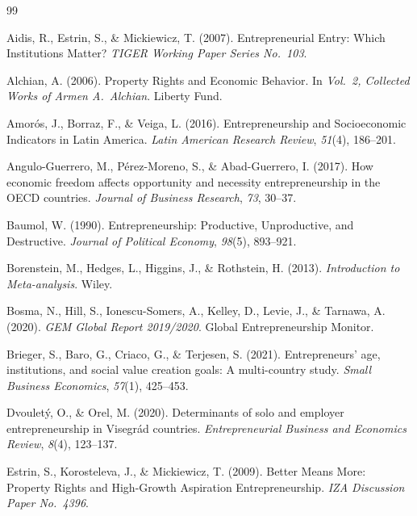 \documentclass[12pt]{article}
\begin{document}
\newpage
\begin{thebibliography}{99}

Aidis, R., Estrin, S., \& Mickiewicz, T. (2007). Entrepreneurial Entry: Which Institutions Matter? \textit{TIGER Working Paper Series No.~103}.

Alchian, A. (2006). Property Rights and Economic Behavior. In \textit{Vol.~2, Collected Works of Armen A.~Alchian}. Liberty Fund.

Amor{\'o}s, J., Borraz, F., \& Veiga, L. (2016). Entrepreneurship and Socioeconomic Indicators in Latin America. \textit{Latin American Research Review}, \textit{51}(4), 186--201.

Angulo-Guerrero, M., P{\'e}rez-Moreno, S., \& Abad-Guerrero, I. (2017). How economic freedom affects opportunity and necessity entrepreneurship in the OECD countries. \textit{Journal of Business Research}, \textit{73}, 30--37.

Baumol, W. (1990). Entrepreneurship: Productive, Unproductive, and Destructive. \textit{Journal of Political Economy}, \textit{98}(5), 893--921.

Borenstein, M., Hedges, L., Higgins, J., \& Rothstein, H. (2013). \textit{Introduction to Meta-analysis}. Wiley.

Bosma, N., Hill, S., Ionescu-Somers, A., Kelley, D., Levie, J., \& Tarnawa, A. (2020). \textit{GEM Global Report 2019/2020}. Global Entrepreneurship Monitor.

Brieger, S., Baro, G., Criaco, G., \& Terjesen, S. (2021). Entrepreneurs' age, institutions, and social value creation goals: A multi-country study. \textit{Small Business Economics}, \textit{57}(1), 425--453.

Dvoulet{\'y}, O., \& Orel, M. (2020). Determinants of solo and employer entrepreneurship in Visegr{\'a}d countries. \textit{Entrepreneurial Business and Economics Review}, \textit{8}(4), 123--137.

Estrin, S., Korosteleva, J., \& Mickiewicz, T. (2009). Better Means More: Property Rights and High-Growth Aspiration Entrepreneurship. \textit{IZA Discussion Paper No.~4396}.


\end{thebibliography}
\end{document}
